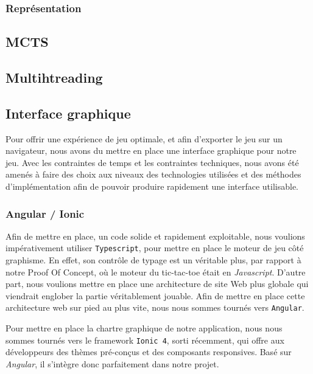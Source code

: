 \documentclass[a4paper,11pt]{article}
\begin{document}
\hypertarget{repruxe9sentation}{%
\subsubsection{Représentation}\label{repruxe9sentation}}

\hypertarget{mcts}{%
\subsection{MCTS}\label{mcts}}

\hypertarget{multihtreading}{%
\subsection{Multihtreading}\label{multihtreading}}

\hypertarget{interface-graphique}{%
\subsection{Interface graphique}\label{interface-graphique}}

Pour offrir une expérience de jeu optimale, et afin d'exporter le jeu
sur un navigateur, nous avons du mettre en place une interface graphique
pour notre jeu. Avec les contraintes de temps et les contraintes
techniques, nous avons été amenés à faire des choix aux niveaux des
technologies utilisées et des méthodes d'implémentation afin de pouvoir
produire rapidement une interface utilisable.

\hypertarget{angular-ionic}{%
\subsubsection{Angular / Ionic}\label{angular-ionic}}

Afin de mettre en place, un code solide et rapidement exploitable, nous
voulions impérativement utiliser \texttt{Typescript}, pour mettre en
place le moteur de jeu côté graphisme. En effet, son contrôle de typage
est un véritable plus, par rapport à notre Proof Of Concept, où le
moteur du tic-tac-toe était en \emph{Javascript}. D'autre part, nous
voulions mettre en place une architecture de site Web plus globale qui
viendrait englober la partie véritablement jouable. Afin de mettre en
place cette architecture web sur pied au plus vite, nous nous sommes
tournés vers \texttt{Angular}.

Pour mettre en place la chartre graphique de notre application, nous
nous sommes tournés vers le framework \texttt{Ionic\ 4}, sorti
récemment, qui offre aux développeurs des thèmes pré-conçus et des
composants responsives. Basé sur \emph{Angular}, il s'intègre donc
parfaitement dans notre projet.
\end{document}

